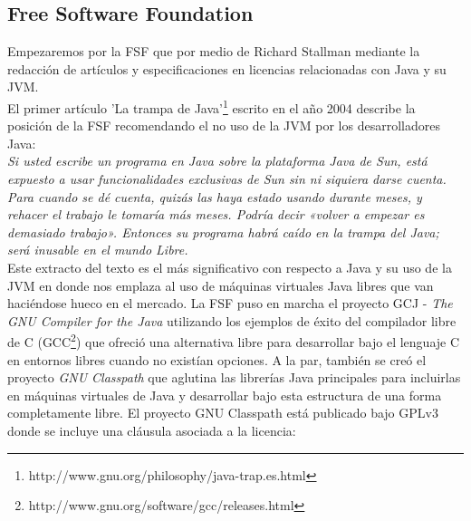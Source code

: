 \documentclass[11pt]{scrartcl}
\begin{document}
\subsection{Free Software Foundation}

Empezaremos por la FSF que por medio de Richard Stallman mediante la redacción de artículos y especificaciones en licencias relacionadas con Java y su JVM.\\

El primer artículo 'La trampa de Java'\footnote{http://www.gnu.org/philosophy/java-trap.es.html} escrito en el año 2004 describe la posición de la FSF recomendando el no uso de la JVM por los desarrolladores Java:\\

    \emph{Si usted escribe un programa en Java sobre la plataforma Java de Sun, está expuesto a usar funcionalidades exclusivas de Sun sin ni siquiera darse cuenta. Para cuando se dé cuenta, quizás las haya estado usando durante meses, y rehacer el trabajo le tomaría más meses. Podría decir «volver a empezar es demasiado trabajo». Entonces su programa habrá caído en la trampa del Java; será inusable en el mundo Libre.}\\
    
Este extracto del texto es el más significativo con respecto a Java y su uso de la JVM en donde nos emplaza al uso de máquinas virtuales Java libres que van haciéndose hueco en el mercado.
La FSF puso en marcha el proyecto GCJ - \emph{The GNU Compiler for the Java} utilizando los ejemplos de éxito del compilador libre de C (GCC\footnote{http://www.gnu.org/software/gcc/releases.html}) que ofreció una alternativa libre para desarrollar bajo el lenguaje C en entornos libres cuando no existían opciones.
A la par, también se creó el proyecto \emph{GNU Classpath} que aglutina las librerías Java principales para incluirlas en máquinas virtuales de Java y desarrollar bajo esta estructura de una forma completamente libre.
El proyecto GNU Classpath está publicado bajo GPLv3 donde se incluye una cláusula asociada a la licencia:\\
\end{document}
